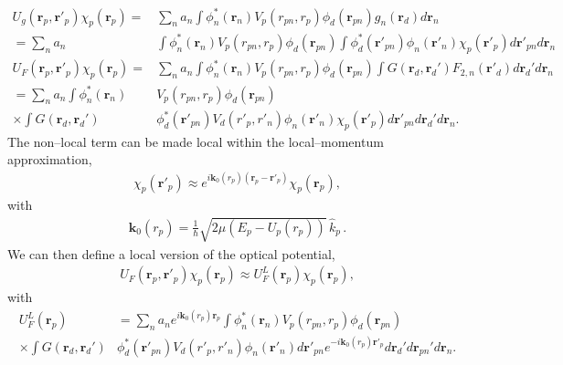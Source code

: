 \documentclass[a4paper,11pt]{article}
\begin{document}
 \begin{align}\label{eq52}
\nonumber U_g(\mathbf r_p,\mathbf r'_p)\chi_p(\mathbf r_p)=&\sum_n a_n\int \phi_n^*(\mathbf r_n)V_p(r_{pn},r_p)\phi_d(\mathbf r_{pn})g_n(\mathbf r_d)d\mathbf r_n\\
\nonumber =\sum_n a_n&\int \phi_n^*(\mathbf r_n)V_p(r_{pn},r_p)\phi_d(\mathbf r_{pn})\int \phi_d^*(\mathbf r'_{pn})\phi_n(\mathbf r'_{n})\chi_p(\mathbf r'_p)d\mathbf r'_{pn}d\mathbf r_n\\
\nonumber U_F(\mathbf r_p,\mathbf r'_p)\chi_p(\mathbf r_p)=&\sum_n a_n\int  \phi_n^*(\mathbf r_n)V_p(r_{pn},r_p)\phi_d(\mathbf r_{pn})\int G(\mathbf r_d,\mathbf r_d')F_{2,n}(\mathbf r'_d)d\mathbf r_d'd\mathbf r_n\\
\nonumber =\sum_n a_n\int  \phi_n^*(\mathbf r_n)&V_p(r_{pn},r_p)\phi_d(\mathbf r_{pn})\\
\times \int G(\mathbf r_d,\mathbf r_d')&\phi_d^*(\mathbf r'_{pn})V_d(r'_{p},r'_n)\phi_n(\mathbf r'_n)\chi_p(\mathbf r'_p)d\mathbf r'_{pn}d\mathbf r_d'd\mathbf r_n.
 \end{align}
The non--local term can be made local within the local--momentum approximation,
\begin{align}\label{eq28}
\chi_p(\mathbf r'_p)\approx e^{i\mathbf k_0(r_p)(\mathbf r_p-\mathbf r'_p)}\chi_p(\mathbf r_p),
\end{align}
with 
\begin{align}\label{eq29}
\mathbf k_0(r_p)=\frac{1}{\hbar}\sqrt{2\mu\left(E_p-U_p(r_p)\right)}\,\hat k_p\,.
\end{align}
We can then define a local version of the optical potential,
\begin{align}\label{eq31}
U_F(\mathbf r_p,\mathbf r'_p)\chi_p(\mathbf r_p)\approx U^L_F(\mathbf r_p)\chi_p(\mathbf r_p),
\end{align}
with
 \begin{align}\label{eq32}
\nonumber U^L_F(\mathbf r_p) &=\sum_n a_n e^{i\mathbf k_0(r_p)\mathbf r_p}\int  \phi_n^*(\mathbf r_n)V_p(r_{pn},r_p)\phi_d(\mathbf r_{pn})\\
\times \int G(\mathbf r_d,\mathbf r_d')&\phi_d^*(\mathbf r'_{pn})V_d(r'_{p},r'_n)\phi_n(\mathbf r'_n)d\mathbf r'_{pn}e^{-i\mathbf k_0(r_p)\mathbf r'_p}d\mathbf r_d'd\mathbf r_{pn}'d\mathbf r_n.
 \end{align}
\end{document}

